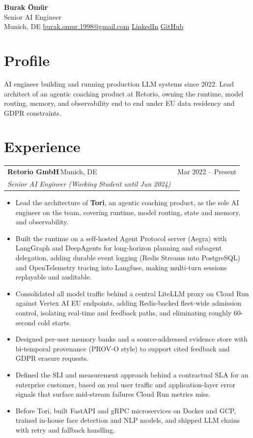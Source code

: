 \documentclass[a4paper,10pt]{article}
\makeatletter
\newcommand{\sep}{\;\raisebox{0.05em}{\textcolor{rule}{\small$\vert$}}\;}
\newcommand{\role}[4]{%
  \vspace{0.25em}%
  \noindent\begin{tabularx}{\linewidth}{@{}X r@{}}
    \textbf{#1}\,\textcolor{muted}{\small #2} & \textcolor{muted}{\small #4}\\[0.05em]
    \textit{#3} & \\
  \end{tabularx}%
  \vspace{-0.15em}%
}
\makeatother
\begin{document}
\begin{center}
  {\sffamily\bfseries\Huge Burak Ömür}\\[0.32em]
  {\sffamily\large\color{accent} Senior AI Engineer}\\[0.55em]
  {\small
    Munich, DE \sep
    \href{mailto:burak.omur.1998@gmail.com}{burak.omur.1998@gmail.com} \sep
    \href{https://www.linkedin.com/in/burak-omur/}{LinkedIn} \sep
    \href{https://github.com/darktheorys}{GitHub}
  }
\end{center}
\vspace{0.4em}

\section{Profile}
\noindent AI engineer building and running production LLM systems since 2022. Lead architect of an
agentic coaching product at Retorio, owning the runtime, model routing, memory, and observability
end to end under EU data residency and GDPR constraints.

\section{Experience}

\role{Retorio GmbH}{Munich, DE}{Senior AI Engineer \textnormal{\small(Working Student until Jun 2024)}}{Mar 2022 -- Present}
\begin{itemize}
  \item Lead the architecture of \textbf{Tori}, an agentic coaching product, as the sole AI engineer
        on the team, covering runtime, model routing, state and memory, and observability.
  \item Built the runtime on a self-hosted Agent Protocol server (Aegra) with LangGraph and DeepAgents
        for long-horizon planning and subagent delegation, adding durable event logging (Redis
        Streams into PostgreSQL) and OpenTelemetry tracing into Langfuse, making multi-turn sessions
        replayable and auditable.
  \item Consolidated all model traffic behind a central LiteLLM proxy on Cloud Run against Vertex AI
        EU endpoints, adding Redis-backed fleet-wide admission control, isolating real-time and
        feedback paths, and eliminating roughly 60-second cold starts.
  \item Designed per-user memory banks and a source-addressed evidence store with bi-temporal
        provenance (PROV-O style) to support cited feedback and GDPR erasure requests.
  \item Defined the SLI and measurement approach behind a contractual SLA for an enterprise customer,
        based on real user traffic and application-layer error signals that surface mid-stream
        failures Cloud Run metrics miss.
  \item Before Tori, built FastAPI and gRPC microservices on Docker and GCP, trained in-house face
        detection and NLP models, and shipped LLM chains with retry and fallback handling.
\end{itemize}
\end{document}
